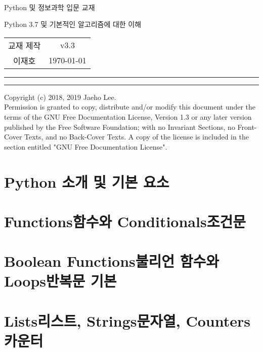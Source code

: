 \documentclass[a4paper, 10pt, twoside, calcwidth]{oblivoir}
\begin{document}
\begin{center}\sffamily
  \text{}\\[1cm]
  \huge Python 및 정보과학 입문 교재

  \vspace{.1cm}
  \Large Python 3.7 및 기본적인 알고리즘에 대한 이해\\[.6cm]
  \begin{tabular} {c c}
    교재 제작 & v3.3\\
    이재호 & \today
  \end{tabular}
\end{center}
\vspace{.5cm}
\noindent\rule[0.5ex]{\linewidth}{.5pt}
\tableofcontents*

\pagebreak
\mbox{}
\vfill
\noindent\rule[0.5ex]{\linewidth}{.5pt}
{\scriptsize
  \noindent Copyright (c)  2018, 2019  Jaeho Lee.\\
  Permission is granted to copy, distribute and/or modify this document
  under the terms of the GNU Free Documentation License, Version 1.3
  or any later version published by the Free Software Foundation;
  with no Invariant Sections, no Front-Cover Texts, and no Back-Cover Texts.
  A copy of the license is included in the section entitled "GNU
  Free Documentation License".
}

\pagebreak

\section{Python 소개 및 기본 요소}



\section{Functions함수와 Conditionals조건문}



\section{Boolean Functions불리언 함수와 Loops반복문 기본}



\section{Lists리스트, Strings문자열, Counters카운터}
\end{document}
